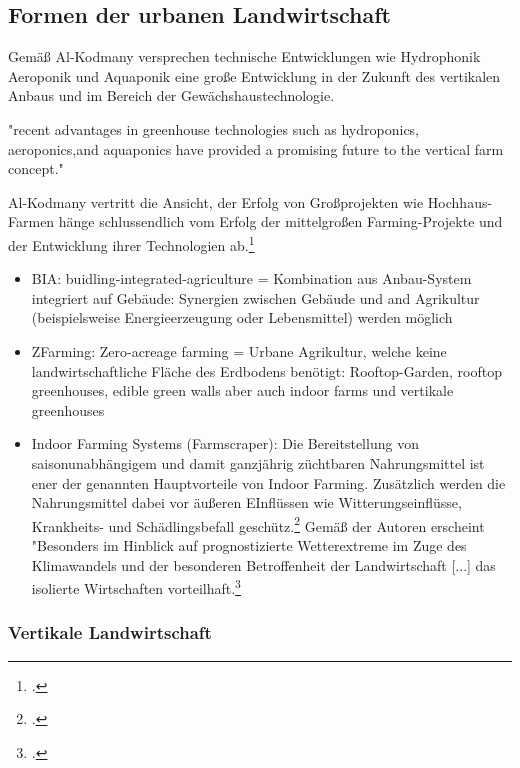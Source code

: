 \documentclass{scrartcl}
\begin{document}
\subsection{Formen der urbanen Landwirtschaft}

Gemäß Al-Kodmany versprechen technische Entwicklungen wie Hydrophonik Aeroponik und Aquaponik eine große Entwicklung in der Zukunft des vertikalen Anbaus und im Bereich der Gewächshaustechnologie. 

\begin{displayquote}
"recent advantages in greenhouse technologies such as hydroponics, aeroponics,and aquaponics have provided a promising future to the vertical farm concept."\end{displayquote}

Al-Kodmany vertritt die Ansicht, der Erfolg von Großprojekten wie Hochhaus-Farmen hänge schlussendlich vom Erfolg der mittelgroßen Farming-Projekte und der Entwicklung ihrer Technologien ab.\footcite[vgl.][S.2ff]{Al-Kodmany2018TheCity}

\begin{itemize}
    \item BIA: buidling-integrated-agriculture = Kombination aus Anbau-System integriert auf  Gebäude: Synergien zwischen Gebäude und  and Agrikultur (beispielsweise Energieerzeugung oder Lebensmittel) werden möglich
    \item ZFarming: Zero-acreage farming = Urbane Agrikultur, welche keine landwirtschaftliche Fläche des Erdbodens benötigt: Rooftop-Garden, rooftop greenhouses, edible green walls aber auch indoor farms und vertikale greenhouses
    \item Indoor Farming Systems (Farmscraper): Die Bereitstellung von saisonunabhängigem und damit ganzjährig züchtbaren Nahrungsmittel ist ener der genannten Hauptvorteile von Indoor Farming. Zusätzlich werden die Nahrungsmittel dabei vor äußeren EInflüssen wie Witterungseinflüsse, Krankheits- und Schädlingsbefall geschütz.\footcite{Schulz2013UrbaneLandmanagements} Gemäß der Autoren erscheint "Besonders im Hinblick auf prognostizierte Wetterextreme im Zuge des Klimawandels und der besonderen Betroffenheit der Landwirtschaft [...] das isolierte Wirtschaften vorteilhaft.\footcite{Schulz2013UrbaneLandmanagements}
\end{itemize}


   
    

\subsubsection{Vertikale Landwirtschaft}
\end{document}
